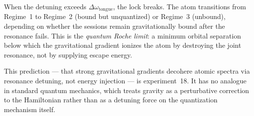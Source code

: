 When the detuning exceeds $\Delta\omega_\text{tongue}$, the lock breaks.
The atom transitions from Regime~1 to Regime~2 (bound but unquantized)
or Regime~3 (unbound), depending on whether the sessions remain
gravitationally bound after the resonance fails.
This is the \emph{quantum Roche limit}: a minimum orbital separation
below which the gravitational gradient ionizes the atom by destroying
the joint resonance, not by supplying escape energy.

This prediction --- that strong gravitational gradients decohere atomic
spectra via resonance detuning, not energy injection --- is
experiment~18.
It has no analogue in standard quantum mechanics, which treats gravity
as a perturbative correction to the Hamiltonian rather than as a
detuning force on the quantization mechanism itself.
